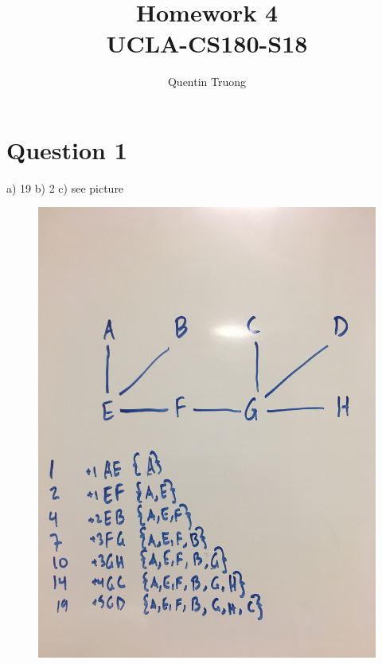 \documentclass[11pt, oneside]{article}
\title{Homework 4\\UCLA-CS180-S18}
\author{Quentin Truong}
\begin{document}
\maketitle
{}


\section{Question 1}
a) 19 \newline
b) 2 \newline
c) see picture \newline
\begin{figure}[ht]
\begin{center}
\includegraphics[scale=0.1]{unnamed.jpg}
\end{center}
\end{figure}

\clearpage
\end{document}
